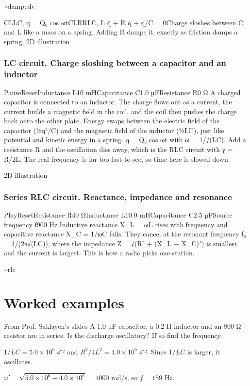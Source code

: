  
\sim{dampedv}

 CLLC, q = Q₀ cos ωtCLRRLC, L q̈ + R q̇ + q/C = 0Charge sloshes between C and L like a mass on a spring. Adding R damps it, exactly as friction damps a spring. 2D illustration
\subsubsection{LC circuit. Charge sloshing between a capacitor and an inductor}

PauseResetInductance L10 mHCapacitance C1.0 µFResistance R0 Ω
A charged capacitor is connected to an inductor. The charge flows out as a current, the current builds a magnetic field in the coil, and the coil then pushes the charge back onto the other plate. Energy swaps between the electric field of the capacitor (½q²/C) and the magnetic field of the inductor (½LI²), just like potential and kinetic energy in a spring. q = Q₀ cos ωt with ω = 1/√(LC). Add a resistance R and the oscillation dies away, which is the RLC circuit with γ = R/2L. The real frequency is far too fast to see, so time here is slowed down.

 2D illustration
\subsubsection{Series RLC circuit. Reactance, impedance and resonance}

PlayResetResistance R40 ΩInductance L10.0 mHCapacitance C2.5 µFSource frequency f900 Hz
Inductive reactance X\_L = ωL rises with frequency and capacitive reactance X\_C = 1/ωC falls. They cancel at the resonant frequency f₀ = 1/(2π√(LC)), where the impedance Z = √(R² + (X\_L − X\_C)²) is smallest and the current is largest. This is how a radio picks one station.

 
\sim{rlc}

 
\section{Worked examples}

 
\begin{example}[Example 1]
From Prof. Saklayen’s slides
A 1.0 µF capacitor, a 0.2 H inductor and an 800 Ω resistor are in series. Is the discharge oscillatory? If so find the frequency.
\begin{solution}
$1/LC=5.0\times10^6$ s⁻² and $R^2/4L^2=4.0\times10^6$ s⁻². Since $1/LC$ is larger, it oscillates.

$\omega'=\sqrt{5.0\times10^6-4.0\times10^6}=1000$ rad/s, so $f=159$ Hz.
\end{solution}
\end{example}

